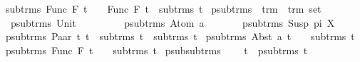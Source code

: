 \begin{isabellebody}
{\isacharbar}{\kern0pt}\ {\isachardoublequoteopen}sub{\isacharunderscore}{\kern0pt}trms\ {\isacharparenleft}{\kern0pt}Func\ F\ t{\isacharparenright}{\kern0pt}\ \ \ {\isacharequal}{\kern0pt}\ {\isacharbraceleft}{\kern0pt}Func\ F\ t{\isacharbraceright}{\kern0pt}\ {\isasymunion}\ sub{\isacharunderscore}{\kern0pt}trms\ t{\isachardoublequoteclose}\isanewline
\isanewline
{}\isamarkupfalse%
\ psub{\isacharunderscore}{\kern0pt}trms\ {\isacharcolon}{\kern0pt}{\isacharcolon}{\kern0pt}\ {\isachardoublequoteopen}trm\ {\isasymRightarrow}\ trm\ set{\isachardoublequoteclose}\isanewline
\ \ \isanewline
\ \ {\isachardoublequoteopen}psub{\isacharunderscore}{\kern0pt}trms\ {\isacharparenleft}{\kern0pt}Unit{\isacharparenright}{\kern0pt}\ \ \ \ \ \ \ {\isacharequal}{\kern0pt}\ {\isacharbraceleft}{\kern0pt}{\isacharbraceright}{\kern0pt}{\isachardoublequoteclose}\isanewline
{\isacharbar}{\kern0pt}\ {\isachardoublequoteopen}psub{\isacharunderscore}{\kern0pt}trms\ {\isacharparenleft}{\kern0pt}Atom\ a{\isacharparenright}{\kern0pt}\ \ \ \ \ {\isacharequal}{\kern0pt}\ {\isacharbraceleft}{\kern0pt}{\isacharbraceright}{\kern0pt}{\isachardoublequoteclose}\isanewline
{\isacharbar}{\kern0pt}\ {\isachardoublequoteopen}psub{\isacharunderscore}{\kern0pt}trms\ {\isacharparenleft}{\kern0pt}Susp\ pi\ X{\isacharparenright}{\kern0pt}\ \ {\isacharequal}{\kern0pt}\ {\isacharbraceleft}{\kern0pt}{\isacharbraceright}{\kern0pt}{\isachardoublequoteclose}\isanewline
{\isacharbar}{\kern0pt}\ {\isachardoublequoteopen}psub{\isacharunderscore}{\kern0pt}trms\ {\isacharparenleft}{\kern0pt}Paar\ t{}\ t{}{\isacharparenright}{\kern0pt}\ {\isacharequal}{\kern0pt}\ sub{\isacharunderscore}{\kern0pt}trms\ t{}\ {\isasymunion}\ sub{\isacharunderscore}{\kern0pt}trms\ t{}{\isachardoublequoteclose}\isanewline
{\isacharbar}{\kern0pt}\ {\isachardoublequoteopen}psub{\isacharunderscore}{\kern0pt}trms\ {\isacharparenleft}{\kern0pt}Abst\ a\ t{\isacharparenright}{\kern0pt}\ \ \ {\isacharequal}{\kern0pt}\ sub{\isacharunderscore}{\kern0pt}trms\ t{\isachardoublequoteclose}\isanewline
{\isacharbar}{\kern0pt}\ {\isachardoublequoteopen}psub{\isacharunderscore}{\kern0pt}trms\ {\isacharparenleft}{\kern0pt}Func\ F\ t{\isacharparenright}{\kern0pt}\ \ \ {\isacharequal}{\kern0pt}\ sub{\isacharunderscore}{\kern0pt}trms\ t{\isachardoublequoteclose}\isanewline
\isanewline
{}\isamarkupfalse%
\ psub{\isacharunderscore}{\kern0pt}sub{\isacharunderscore}{\kern0pt}trms{\isacharcolon}{\kern0pt}\ \isanewline
\ \ \ {\isachardoublequoteopen}t{}\ {\isasymin}\ psub{\isacharunderscore}{\kern0pt}trms\ t{}{\isachardoublequoteclose}\ \isanewline

\end{isabellebody}
